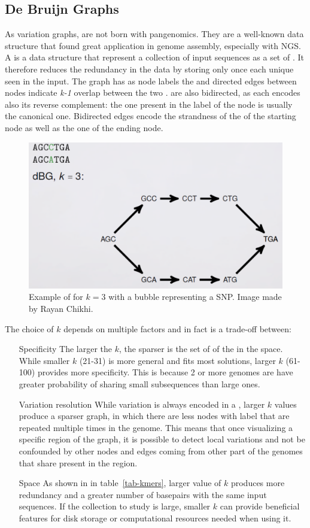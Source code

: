 \subsection{De Bruijn Graphs}
As variation graphs, \dbgs are not born with pangenomics. They are a well-known data structure that found great application in genome assembly, especially with NGS.
A \dbg is a data structure that represent a collection of input sequences as a set of \kmers. It therefore reduces the redundancy in the data by storing only once each unique \kmer seen in the input. The graph has as node labels the \kmers and directed edges between nodes indicate \emph{k-1} overlap between the two \kmers. \dbgs are also bidirected, as each \kmer encodes also its reverse complement: the one present in the label of the node is usually the canonical one. Bidirected edges encode the strandness of the \kmer of the starting node as well as the one of the ending node. 
\begin{figure}[h!]
	\centering
	\includegraphics[width=.95\linewidth]{figures/background/dbg.png}
	\caption[Example of \dbg.]{Example of \dbg for $k=3$ with a bubble representing a SNP. Image made by Rayan Chikhi.}
	\label{fig:dbg_ex}
\end{figure}
The choice of $k$ depends on multiple factors and in fact is a trade-off between: 
\begin{itemize}
	\item[Specificity] The larger the $k$, the sparser is the set of \kmers of the \dbg in the space. While smaller $k$ (21-31) is more general and fits most solutions, larger $k$ (61-100) provides more specificity. This is because 2 or more genomes are have greater probability of sharing small subsequences than large ones.
	\item[Variation resolution] While variation is always encoded in a \dbg, larger $k$ values produce a sparser graph, in which there are less nodes with label \kmers that are repeated multiple times in the genome. This means that once visualizing a specific region of the graph, it is possible to detect local variations and not be confounded by other nodes and edges coming from other part of the genomes that share \kmers present in the region.
	\item[Space] As shown in in table~\ref{tab-kmers}, larger value of $k$ produces more redundancy and a greater number of basepairs with the same input sequences. If the collection to study is large, smaller $k$ can provide beneficial features for disk storage or computational resources needed when using it.
\end{itemize}
